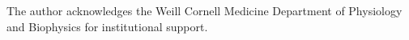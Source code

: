 The author acknowledges the Weill Cornell Medicine Department of Physiology and Biophysics for institutional support.
